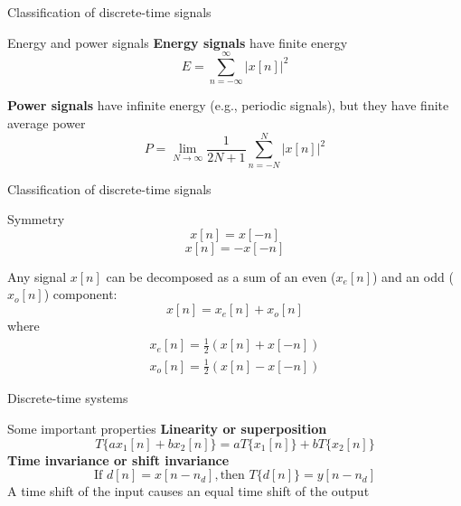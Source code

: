 \documentclass[10pt]{beamer}
\begin{document}
%
\begin{frame}{Classification of discrete-time signals}
\begin{block}{Energy and power signals}
	\textbf{Energy signals} have finite energy
	\begin{equation*}
		E = \sum_{n=-\infty}^{\infty} |x[n]|^2
	\end{equation*}
	
	\textbf{Power signals} have infinite energy (e.g., periodic signals), but they have finite average power
	\begin{equation*}
		P = \lim_{N\to\infty}\frac{1}{2N+1}\sum_{n=-N}^{N} |x[n]|^2
	\end{equation*}	
\end{block}	
\end{frame}

%
\begin{frame}{Classification of discrete-time signals}
\begin{block}{Symmetry}
	\begin{equation*}
	x[n] = x[-n] \tag{even symmetry}
	\end{equation*}
	\begin{equation*}
	x[n] = -x[-n] \tag{odd symmetry}
	\end{equation*}
	
	Any signal $x[n]$ can be decomposed as a sum of an even ($x_e[n]$) and an odd ($x_o[n]$) component:
	\begin{equation*}
	x[n] = x_e[n] + x_o[n]
	\end{equation*}	
	where 
	\begin{align}
	x_e[n] = \frac{1}{2}(x[n] + x[-n]) \tag{even component} \\
	x_o[n] = \frac{1}{2}(x[n] - x[-n]) \tag{odd component}
	\end{align}
\end{block}	
\end{frame}

%
\begin{frame}{Discrete-time systems}

\begin{figure}
	\centering
	\resizebox{0.9\linewidth}{!}{}
	\label{fig:DTsystem}
\end{figure}

\begin{block}{Some important properties}
	\textbf{Linearity or superposition}
	\begin{equation*}
	T\{ax_1[n] + bx_2[n]\} = aT\{x_1[n]\} + bT\{x_2[n]\}
	\end{equation*}
	\textbf{Time invariance or shift invariance}
	\begin{equation*}
	\text{If } d[n] = x[n-n_d], \text{then } T\{d[n]\} = y[n-n_d]
	\end{equation*}
	A time shift of the input causes an equal time shift of the output
\end{block}
\end{frame}
\end{document}
